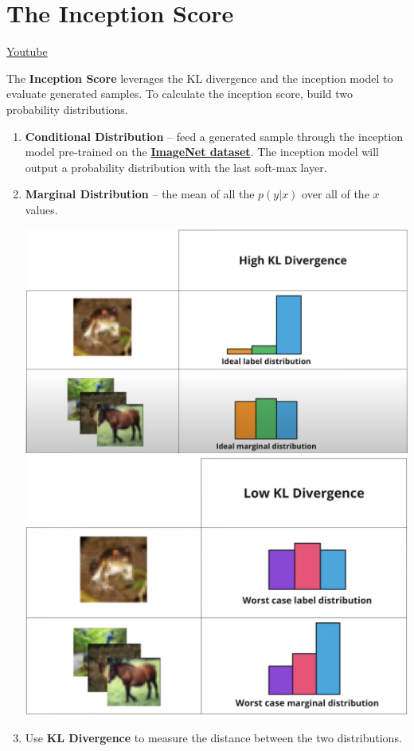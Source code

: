 \section{The Inception Score}
\href{https://www.youtube.com/watch?v=OLnqLdfOpHc}{Youtube} \newline

The \textbf{Inception Score} leverages the KL divergence and the inception model to evaluate generated samples. To calculate the inception score, build two probability distributions.

\begin{enumerate}
    \item \textbf{Conditional Distribution} – feed a generated sample through the inception model pre-trained on the \href{https://www.image-net.org/}{\textbf{ImageNet dataset}}. The inception model will output a probability distribution with the last soft-max layer.
    \item \textbf{Marginal Distribution} – the mean of all the \(p(y|x)\) over all of the \(x\) values.

    \includegraphics[width=0.5\linewidth]{img//genAdvNet//deepGAN/maeginalDist.png}
    \includegraphics[width=0.5\linewidth]{img//genAdvNet//deepGAN/marginalDistLowKL.png}
    \item Use \textbf{KL Divergence} to measure the distance between the two distributions.
\end{enumerate}

